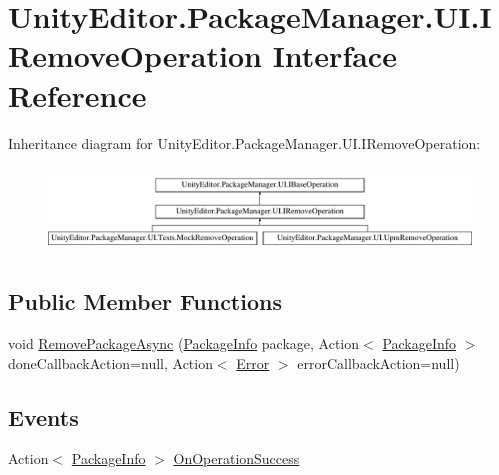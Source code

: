 \hypertarget{interface_unity_editor_1_1_package_manager_1_1_u_i_1_1_i_remove_operation}{}\section{Unity\+Editor.\+Package\+Manager.\+U\+I.\+I\+Remove\+Operation Interface Reference}
\label{interface_unity_editor_1_1_package_manager_1_1_u_i_1_1_i_remove_operation}
Inheritance diagram for Unity\+Editor.\+Package\+Manager.\+U\+I.\+I\+Remove\+Operation\+:\begin{figure}[H]
\begin{center}
\leavevmode
\includegraphics[height=2.276423cm]{interface_unity_editor_1_1_package_manager_1_1_u_i_1_1_i_remove_operation}
\end{center}
\end{figure}
\subsection*{Public Member Functions}
\begin{DoxyCompactItemize}
\item 
void \mbox{\hyperlink{interface_unity_editor_1_1_package_manager_1_1_u_i_1_1_i_remove_operation_a83f4739b21051b92ceb18336953a6af1}{Remove\+Package\+Async}} (\mbox{\hyperlink{class_unity_editor_1_1_package_manager_1_1_u_i_1_1_package_info}{Package\+Info}} package, Action$<$ \mbox{\hyperlink{class_unity_editor_1_1_package_manager_1_1_u_i_1_1_package_info}{Package\+Info}} $>$ done\+Callback\+Action=null, Action$<$ \mbox{\hyperlink{namespace_unity_editor_1_1_package_manager_1_1_u_i_ab1815eb3e48074893d9dc1dc99a4a32aa902b0d55fddef6f8d651fe1035b7d4bd}{Error}} $>$ error\+Callback\+Action=null)
\end{DoxyCompactItemize}
\subsection*{Events}
\begin{DoxyCompactItemize}
\item 
Action$<$ \mbox{\hyperlink{class_unity_editor_1_1_package_manager_1_1_u_i_1_1_package_info}{Package\+Info}} $>$ \mbox{\hyperlink{interface_unity_editor_1_1_package_manager_1_1_u_i_1_1_i_remove_operation_a533765ac0561fe7a7dd0eb718239594b}{On\+Operation\+Success}}
\end{DoxyCompactItemize}
